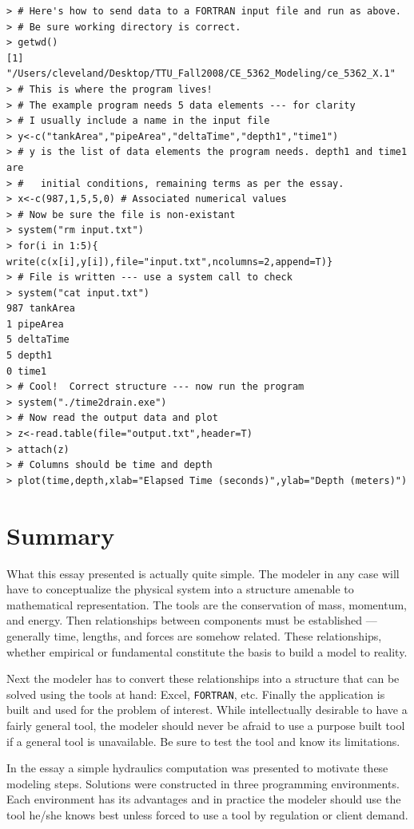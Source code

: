 \documentclass[12pt]{article}
\begin{document}
\begin{verbatim}
> # Here's how to send data to a FORTRAN input file and run as above.
> # Be sure working directory is correct.
> getwd()
[1] "/Users/cleveland/Desktop/TTU_Fall2008/CE_5362_Modeling/ce_5362_X.1"
> # This is where the program lives!
> # The example program needs 5 data elements --- for clarity
> # I usually include a name in the input file
> y<-c("tankArea","pipeArea","deltaTime","depth1","time1")
> # y is the list of data elements the program needs. depth1 and time1 are 
> #   initial conditions, remaining terms as per the essay.
> x<-c(987,1,5,5,0) # Associated numerical values
> # Now be sure the file is non-existant
> system("rm input.txt")
> for(i in 1:5){ write(c(x[i],y[i]),file="input.txt",ncolumns=2,append=T)}
> # File is written --- use a system call to check
> system("cat input.txt")
987 tankArea
1 pipeArea
5 deltaTime
5 depth1
0 time1
> # Cool!  Correct structure --- now run the program
> system("./time2drain.exe")
> # Now read the output data and plot
> z<-read.table(file="output.txt",header=T)
> attach(z)
> # Columns should be time and depth
> plot(time,depth,xlab="Elapsed Time (seconds)",ylab="Depth (meters)")
\end{verbatim}



\section{Summary}
What this essay presented is actually quite simple.  The modeler in any case will have to conceptualize the physical system into a structure amenable to mathematical representation.  The tools are the conservation of mass, momentum, and energy.  Then relationships between components must be established --- generally time, lengths, and forces are somehow related.  These relationships, whether empirical or fundamental constitute the basis to build a model to reality.

Next the modeler has to convert these relationships into a structure that can be solved using the tools at hand: Excel, \texttt{FORTRAN}, etc.  Finally the application is built and used for the problem of interest.  While intellectually desirable to have a fairly general tool, the modeler should never be afraid to use a purpose built tool if a general tool is unavailable.  Be sure to test the tool and know its limitations.

In the essay a simple hydraulics computation was presented to motivate these modeling steps.  Solutions were constructed in three programming environments.   Each environment has its advantages and in practice the modeler should use the tool he/she knows best unless forced to use a tool by regulation or client demand.  
\end{document}
